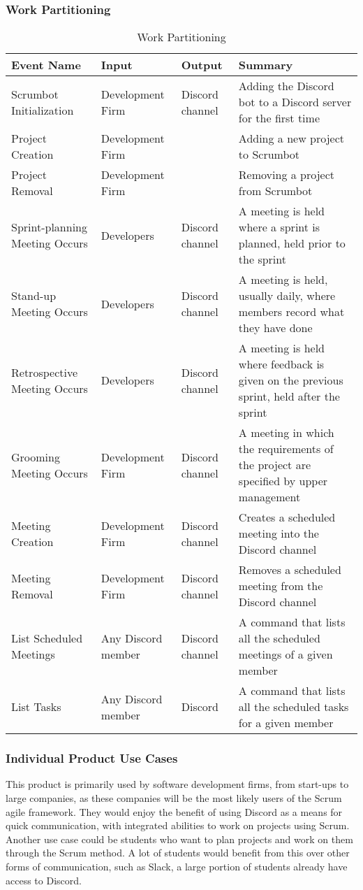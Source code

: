 \documentclass[12pt, titlepage]{article}
\begin{document}
\subsubsection{Work Partitioning}
\begin{longtable}{|L{4cm}|L{3cm}|L{1.5cm}|L{6cm}|}
    \caption{Work Partitioning}
    \label{tab:my_label}\\
    \hline
    Event Name & Input & Output & Summary \\
    \hline
    Scrumbot Initialization & Development Firm & Discord channel & Adding the Discord bot to a Discord server for the first time\\
    \hline
    Project Creation & Development Firm & & Adding a new project to Scrumbot\\
    \hline
    Project Removal & Development Firm & & Removing a project from Scrumbot\\
    \hline
    Sprint-planning Meeting Occurs & Developers & Discord channel & A meeting is held where a sprint is planned, held prior to the sprint\\
    \hline
    Stand-up Meeting Occurs & Developers & Discord channel & A meeting is held, usually daily, where members record what they have done\\
    \hline
    Retrospective Meeting Occurs & Developers & Discord channel & A meeting is held where feedback is given on the previous sprint, held after the sprint\\
    \hline
    Grooming Meeting Occurs & Development Firm & Discord channel & A meeting in which the requirements of the project are specified by upper management\\
    \hline
    Meeting Creation & Development Firm & Discord channel & Creates a scheduled meeting into the Discord channel\\
    \hline
    Meeting Removal & Development Firm & Discord channel & Removes a scheduled meeting from the Discord channel\\
    \hline
    List Scheduled Meetings & Any Discord member & Discord channel & A command that lists all the scheduled meetings of a given member\\
    \hline
    List Tasks & Any Discord member & Discord & A command that lists all the scheduled tasks for a given member\\
    \hline
\end{longtable}

\subsubsection{Individual Product Use Cases}
This product is primarily used by software development firms, from start-ups to large companies, as these companies will be the most likely users of the Scrum agile framework. They would enjoy the benefit of using Discord as a means for quick communication, with integrated abilities to work on projects using Scrum.\\
Another use case could be students who want to plan projects and work on them through the Scrum method. A lot of students would benefit from this over other forms of communication, such as Slack, a large portion of students already have access to Discord.
\end{document}

